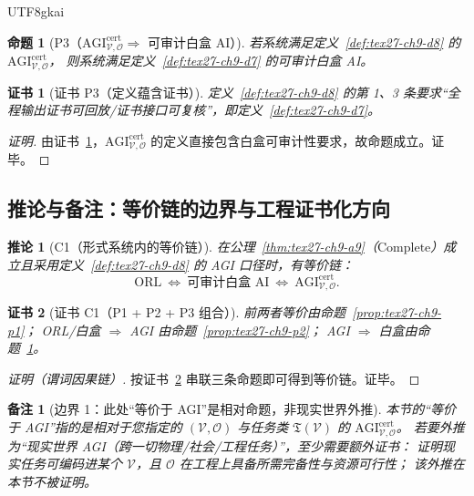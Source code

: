 \documentclass[12pt]{article}
\newtheorem{proposition}{命题}[section]
\newtheorem{corollary}{推论}[section]
\newtheorem{remark}{备注}[section]
\newtheorem{Certificate}{证书}[section]
\begin{document}
\begin{CJK*}{UTF8}{gkai}
\begin{proposition}[P3（$\mathrm{AGI}^{\mathrm{cert}}_{\mathcal{V},\mathcal{O}} \Rightarrow$ 可审计白盒 AI）]
\label{prop:tex27-ch9-p3}
若系统满足定义~\ref{def:tex27-ch9-d8} 的 $\mathrm{AGI}^{\mathrm{cert}}_{\mathcal{V},\mathcal{O}}$，
则系统满足定义~\ref{def:tex27-ch9-d7} 的可审计白盒 AI。
\end{proposition}

\begin{Certificate}[证书 P3（定义蕴含证书）]
\label{cert:tex27-ch9-p3}
定义~\ref{def:tex27-ch9-d8} 的第 1、3 条要求“全程输出证书可回放/证书接口可复核”，即定义~\ref{def:tex27-ch9-d7}。
\end{Certificate}

\begin{proof}[证明]
由证书~\ref{cert:tex27-ch9-p3}，$\mathrm{AGI}^{\mathrm{cert}}_{\mathcal{V},\mathcal{O}}$ 的定义直接包含白盒可审计性要求，故命题成立。证毕。
\end{proof}

\subsection{推论与备注：等价链的边界与工程证书化方向}
\label{subsec:tex27-ch9-others}

\begin{corollary}[C1（形式系统内的等价链）]
\label{cor:tex27-ch9-c1}
在公理~\ref{thm:tex27-ch9-a9}（$\mathrm{Complete}$）成立且采用定义~\ref{def:tex27-ch9-d8} 的 AGI 口径时，有等价链：
\[
  \mathrm{ORL}\ \Longleftrightarrow\ \text{可审计白盒 AI}\ \Longleftrightarrow\ \mathrm{AGI}^{\mathrm{cert}}_{\mathcal{V},
    \mathcal{O}}.
\]
\end{corollary}

\begin{Certificate}[证书 C1（P1 + P2 + P3 组合）]
\label{cert:tex27-ch9-c1}
前两者等价由命题~\ref{prop:tex27-ch9-p1}；
ORL/白盒 $\Rightarrow$ AGI 由命题~\ref{prop:tex27-ch9-p2}；
AGI $\Rightarrow$ 白盒由命题~\ref{prop:tex27-ch9-p3}。
\end{Certificate}

\begin{proof}[证明（谓词因果链）]
按证书~\ref{cert:tex27-ch9-c1} 串联三条命题即可得到等价链。证毕。
\end{proof}

\begin{remark}[边界 1：此处“等价于 AGI”是相对命题，非现实世界外推]
\label{rem:tex27-ch9-r1}
本节的“等价于 AGI”指的是相对于您指定的 $(\mathcal{V},\mathcal{O})$ 与任务类 $\mathfrak{T}(\mathcal{V})$ 的
$\mathrm{AGI}^{\mathrm{cert}}_{\mathcal{V},\mathcal{O}}$。
若要外推为“现实世界 AGI（跨一切物理/社会/工程任务）”，至少需要额外证书：
证明现实任务可编码进某个 $\mathcal{V}$，且 $\mathcal{O}$ 在工程上具备所需完备性与资源可行性；
该外推在本节不被证明。
\end{remark}


\end{CJK*}
\end{document}
